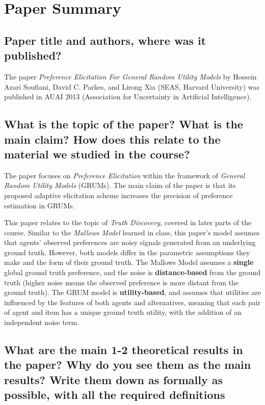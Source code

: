 \section{Paper Summary}

\subsection{
    Paper title and authors, where was it published?
}

The paper \textit{Preference Elicitation For General Random Utility Models} by Hossein Azari Soufiani, David C. Parkes, and Lirong Xia (SEAS, Harvard University) was published in AUAI 2013 (Association for Uncertainty in Artificial Intelligence).

\subsection{
    What is the topic of the paper?
    What is the main claim?
    How does this relate to the material we studied in the course?
}

The paper focuses on \textit{Preference Elicitation} within the framework of \textit{General Random Utility Models} (GRUMs).
The main claim of the paper is that its proposed adaptive elicitation scheme increases the precision of preference estimation in GRUMs.

This paper relates to the topic of \textit{Truth Discovery}, covered in later parts of the course.
Similar to the \textit{Mallows Model} learned in class, this paper's model assumes that agents' observed preferences are noisy signals generated from an underlying ground truth.
However, both models differ in the parametric assumptions they make and the form of their ground truth.
The Mallows Model assumes a \textbf{single} global ground truth preference, and the noise is \textbf{distance-based} from the ground truth (higher noise means the observed preference is more distant from the ground truth).
The GRUM model is \textbf{utility-based}, and assumes that utilities are influenced by the features of both agents and alternatives, meaning that each pair of agent and item has a unique ground truth utility, with the addition of an independent noise term.

\subsection{
    What are the main 1-2 theoretical results in the paper?
    Why do you see them as the main results?
    Write them down as formally as possible, with all the required definitions
}

